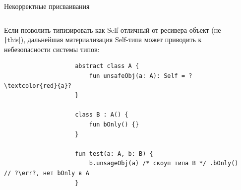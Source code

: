 \documentclass[aspectratio=169,usenames,dvipsnames]{beamer}
\newcommand{\err}[0]{\textcolor{red}{ошибка}}
\begin{document}
    \begin{frame}[fragile]{Некорректные присваивания}
        \begin{columns}[onlytextwidth]
            \begin{column}{0.99\textwidth}
                Если позволить типизировать как Self отличный от ресивера объект (не \texttt|this|), дальнейшая материализация Self-типа может приводить к небезопасности системы типов:

                \begin{verbatim}
                    abstract class A {
                        fun unsafeObj(a: A): Self = ?\textcolor{red}{a}?
                    }

                    class B : A() {
                        fun bOnly() {}
                    }

                    fun test(a: A, b: B) {
                        b.unsageObj(a) /* скоуп типа B */ .bOnly() // ?\err?, нет bOnly в A
                    }
                \end{verbatim}
            \end{column}\hfill%
            \begin{column}{0.0\textwidth}
            \end{column}
        \end{columns}
    \end{frame}
\end{document}
